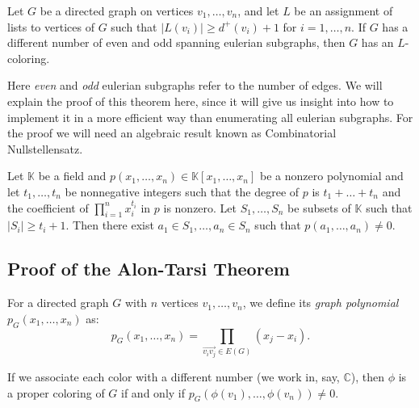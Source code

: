 \begin{theorem}
\label{alontarsitheorem}
Let $G$ be a directed graph on vertices $v_1, \ldots, v_n$, and let $L$ be an assignment of lists to vertices of $G$ such that 
$|L(v_i)| \geq d^+(v_i)+1$ for $i = 1, \ldots, n$. If $G$ has a different number of even and odd spanning eulerian subgraphs,
then $G$ has an $L$-coloring.
\end{theorem}

Here \emph{even} and \emph{odd} eulerian subgraphs refer to the number of edges. We will explain the proof of this theorem here,
since it will give us insight into how to implement it in a more efficient way than enumerating all eulerian subgraphs. For the
proof we will need an algebraic result known as Combinatorial Nullstellensatz.

\begin{theorem}
Let $\mathbb{K}$ be a field and $p(x_1, \ldots, x_n) \in \mathbb{K}[x_1, \ldots, x_n]$ be a nonzero polynomial and let $t_1, \ldots, t_n$ be nonnegative integers such that the
 degree of $p$ is $t_1 + \ldots + t_n$ and the coefficient of $\prod_{i=1}^n x_i^{t_i}$ in $p$ is nonzero. 
 Let $S_1, \ldots, S_n$ be subsets of $\mathbb{K}$ such that $|S_i| \geq t_i+1$. Then there exist $a_1 \in S_1, \ldots, a_n \in S_n$ such that
$p(a_1, \ldots, a_n) \neq 0$.
\end{theorem}

\subsection{Proof of the Alon-Tarsi Theorem}

\begin{definition}
For a directed graph $G$ with $n$ vertices $v_1, \ldots, v_n$, we define its \emph{graph polynomial} $p_G(x_1, \ldots, x_n)$ as:
\begin{equation}
\label{eq:graphpolynomialproduct}
p_G(x_1, \ldots, x_n) = \prod_{\overrightarrow{v_iv_j}\in E(G)} (x_j-x_i).
\end{equation}
\end{definition}


\begin{observation}
If we associate each color with a different number (we work in, say, $\mathbb{C}$), then $\phi$ is a proper coloring of 
$G$ if and only if $p_G(\phi(v_1), \ldots, \phi(v_n)) \neq 0$. 
\end{observation}

